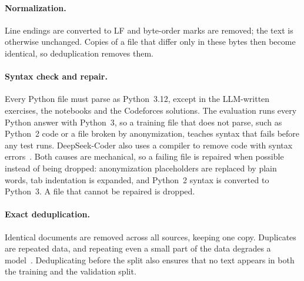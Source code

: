 \documentclass[sigconf,nonacm,balance=false]{acmart}
\begin{document}
\paragraph{Normalization.} Line endings are converted to LF and byte-order marks are removed; the text is otherwise
unchanged. Copies of a file that differ only in these bytes then become identical, so deduplication removes them.

\paragraph{Syntax check and repair.} Every Python file must parse as Python~3.12, except in the LLM-written
exercises, the notebooks and the Codeforces solutions. The evaluation runs every Python answer with Python~3, so a
training file that does not parse, such as Python~2 code or a file broken by anonymization, teaches syntax that fails
before any test runs. DeepSeek-Coder also uses a compiler to remove code with syntax errors~\cite{guo2024deepseekcoder}.
Both causes are mechanical, so a failing file is repaired when possible instead of being dropped: anonymization
placeholders are replaced by plain words, tab indentation is expanded, and Python~2 syntax is converted to Python~3.
A file that cannot be repaired is dropped.

\paragraph{Exact deduplication.} Identical documents are removed across all sources, keeping one copy. Duplicates are
repeated data, and repeating even a small part of the data degrades a model~\cite{hernandez2022repeated}.
Deduplicating before the split also ensures that no text appears in both the training and the validation split.
\end{document}
